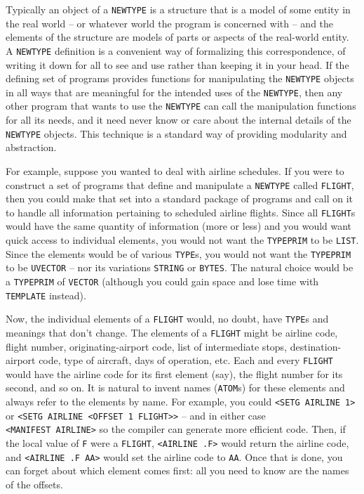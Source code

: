 \documentclass[a4paper]{scrbook}
\begin{document}
Typically an object of a \texttt{NEWTYPE} is a structure that is a model of some entity in the real world -- or whatever
world the program is concerned with -- and the elements of the structure are models of parts or aspects of the real-world
entity. A \texttt{NEWTYPE} definition is a convenient way of formalizing this correspondence, of writing it down for all to
see and use rather than keeping it in your head. If the defining set of programs provides functions for manipulating the
\texttt{NEWTYPE} objects in all ways that are meaningful for the intended uses of the \texttt{NEWTYPE}, then any other
program that wants to use the \texttt{NEWTYPE} can call the manipulation functions for all its needs, and it need never
know or care about the internal details of the \texttt{NEWTYPE} objects. This technique is a standard way of providing
modularity and abstraction.

For example, suppose you wanted to deal with airline schedules. If you were to construct a set of programs that define and
manipulate a \texttt{NEWTYPE} called \texttt{FLIGHT}, then you could make that set into a standard package of programs and
call on it to handle all information pertaining to scheduled airline flights. Since all \texttt{FLIGHT}s would have the
same quantity of information (more or less) and you would want quick access to individual elements, you would not want the
\texttt{TYPEPRIM} to be \texttt{LIST}. Since the elements would be of various \texttt{TYPE}s, you would not want the
\texttt{TYPEPRIM} to be \texttt{UVECTOR} -- nor its variations \texttt{STRING} or \texttt{BYTES}. The natural choice would
be a \texttt{TYPEPRIM} of \texttt{VECTOR} (although you could gain space and lose time with \texttt{TEMPLATE} instead).

Now, the individual elements of a \texttt{FLIGHT} would, no doubt, have \texttt{TYPE}s and meanings that don't change. The
elements of a \texttt{FLIGHT} might be airline code, flight number, originating-airport code, list of intermediate stops,
destination-airport code, type of aircraft, days of operation, etc. Each and every \texttt{FLIGHT} would have the airline
code for its first element (say), the flight number for its second, and so on. It is natural to invent names
(\texttt{ATOM}s) for these elements and always refer to the elements by name. For example, you could
\texttt{\textless{}SETG\ AIRLINE\ 1\textgreater{}} or
\texttt{\textless{}SETG\ AIRLINE\ \textless{}OFFSET\ 1\ FLIGHT\textgreater{}\textgreater{}} -- and in either case
\texttt{\textless{}MANIFEST\ AIRLINE\textgreater{}} so the compiler can generate more efficient code. Then, if the local
value of \texttt{F} were a \texttt{FLIGHT}, \texttt{\textless{}AIRLINE\ .F\textgreater{}} would return the airline code,
and \texttt{\textless{}AIRLINE\ .F\ AA\textgreater{}} would set the airline code to \texttt{AA}. Once that is done, you can
forget about which element comes first: all you need to know are the names of the offsets.
\end{document}
